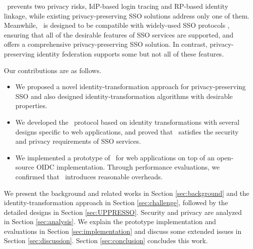 
\usso~prevents two privacy risks, IdP-based login tracing and RP-based identity linkage, while existing privacy-preserving SSO solutions \cite{BrowserID, SPRESSO, NIST2017draft, FirefoxAccount} address only one of them. Meanwhile, \usso~is designed to be compatible with widely-used SSO protocols \cite{OpenIDConnect, rfc6749, SAML, NIST2017draft}, ensuring that all of the desirable features of SSO services are supported, and offers a comprehensive privacy-preserving SSO solution. In contrast, privacy-preserving identity federation \cite{PseudoID, ELPASSO, UnlimitID, Opaak, uprov, hyperledge-idemix} supports some but not all of these features. 

Our contributions are as follows.
\vspace{-\topsep}\begin{itemize}
\setlength{\topsep}{0pt}
\setlength{\partopsep}{0pt}
\setlength{\itemsep}{0pt}
\setlength{\parsep}{0pt}
\setlength{\parskip}{0pt}
\item We proposed a novel identity-transformation approach for privacy-preserving SSO and also designed identity-transformation algorithms with desirable properties.
\item We developed the \usso~protocol based on identity transformations with several designs specific to web applications, and proved that \usso~satisfies the security and privacy requirements of SSO services.
\item We implemented a prototype of \usso~for web applications on top of an open-source OIDC implementation. Through performance evaluations, we confirmed that \usso~introduces reasonable overheads.
\end{itemize}


We present the background and related works in Section \ref{sec:background} and the identity-transformation approach in Section \ref{sec:challenge}, followed by the detailed designs in Section \ref{sec:UPPRESSO}.
Security and privacy are analyzed in Section \ref{sec:analysis}. We explain the prototype implementation and evaluations in Section \ref{sec:implementation} and discuss some extended issues in Section \ref{sec:discussion}. Section \ref{sec:conclusion} concludes this work.
